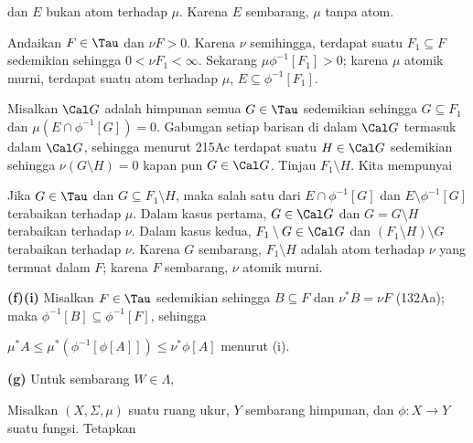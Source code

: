 {\noindent dan $E$ bukan atom terhadap $\mu$. Karena $E$ sembarang, $\mu$
tanpa atom.

\medskip

 Andaikan $F\in\Tau$ dan $\nu F>0$. Karena $\nu$
semihingga, terdapat suatu $F_1\subseteq F$ sedemikian sehingga
$0<\nu F_1<\infty$. Sekarang $\mu\phi^{-1}[F_1]>0$; karena $\mu$
atomik murni, terdapat suatu atom terhadap $\mu$,
$E\subseteq\phi^{-1}[F_1]$.

Misalkan $\Cal G$ adalah himpunan semua $G\in\Tau$ sedemikian sehingga
$G\subseteq F_1$ dan $\mu(E\cap\phi^{-1}[G])=0$. Gabungan setiap barisan
di dalam $\Cal G$ termasuk dalam $\Cal G$, sehingga menurut 215Ac terdapat
suatu $H\in\Cal G$ sedemikian sehingga $\nu(G\setminus H)=0$ kapan pun
$G\in\Cal G$. Tinjau $F_1\setminus H$. Kita mempunyai


\noindent Jika $G\in\Tau$ dan $G\subseteq F_1\setminus H$,
maka salah satu dari $E\cap\phi^{-1}[G]$ dan
$E\setminus\phi^{-1}[G]$ terabaikan terhadap $\mu$.
Dalam kasus pertama, $G\in\Cal G$ dan $G=G\setminus H$ terabaikan terhadap
$\nu$. Dalam kasus kedua, $F_1\setminus G\in\Cal G$ dan
$(F_1\setminus H)\setminus G$ terabaikan terhadap $\nu$. Karena $G$
sembarang, $F_1\setminus H$ adalah atom terhadap $\nu$ yang termuat dalam
$F$; karena $F$ sembarang, $\nu$ atomik murni.

\medskip

{\bf (f)(i)} Misalkan $F\in\Tau$ sedemikian sehingga $B\subseteq F$ dan
$\nu^*B=\nu F$ (132Aa); maka $\phi^{-1}[B]\subseteq\phi^{-1}[F]$, sehingga


\medskip

 $\mu^*A\le\mu^*(\phi^{-1}[\phi[A]])\le\nu^*\phi[A]$
menurut (i).

\medskip

{\bf (g)} Untuk sembarang $W\in\Lambda$,

}%


 Misalkan $(X,\Sigma,\mu)$ suatu ruang ukur,
$Y$ sembarang himpunan, dan $\phi:X\to Y$ suatu fungsi. Tetapkan

